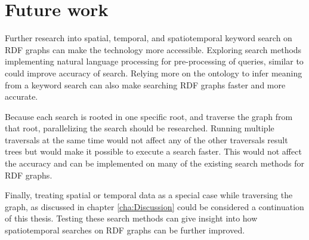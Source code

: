 \section{Future work}
\label{sec:futureWork}
Further research into spatial, temporal, and spatiotemporal keyword search on RDF graphs can make the technology more accessible. Exploring search methods implementing natural language processing for pre-processing of queries, similar to \cite{aqualog} could improve accuracy of search. Relying more on the ontology to infer meaning from a keyword search can also make searching RDF graphs faster and more accurate.

Because each search is rooted in one specific root, and traverse the graph from that root, parallelizing the search should be researched. Running multiple traversals at the same time would not affect any of the other traversals result trees but would make it possible to execute a search faster. This would not affect the accuracy and can be implemented on many of the existing search methods for RDF graphs.

Finally, treating spatial or temporal data as a special case while traversing the graph, as discussed in chapter \ref{cha:Discussion} could be considered a continuation of this thesis. Testing these search methods can give insight into how spatiotemporal searches on RDF graphs can be further improved.